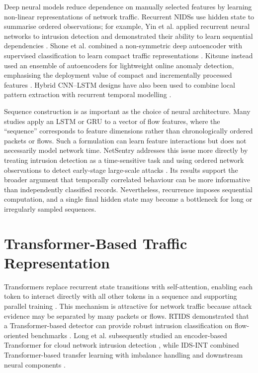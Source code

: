 \documentclass[11pt,fleqn]{report}
\begin{document}
Deep neural models reduce dependence on manually selected features by learning non-linear representations of network traffic. Recurrent NIDSs use hidden state to summarise ordered observations; for example, Yin et al. applied recurrent neural networks to intrusion detection and demonstrated their ability to learn sequential dependencies \cite{Yin2017RNNIDS}. Shone et al. combined a non-symmetric deep autoencoder with supervised classification to learn compact traffic representations \cite{Shone2018NNAE}. Kitsune instead used an ensemble of autoencoders for lightweight online anomaly detection, emphasising the deployment value of compact and incrementally processed features \cite{Mirsky2018Kitsune}. Hybrid CNN--LSTM designs have also been used to combine local pattern extraction with recurrent temporal modelling \cite{Ullah2024IDSINT}.

Sequence construction is as important as the choice of neural architecture. Many studies apply an LSTM or GRU to a vector of flow features, where the ``sequence'' corresponds to feature dimensions rather than chronologically ordered packets or flows. Such a formulation can learn feature interactions but does not necessarily model network time. NetSentry addresses this issue more directly by treating intrusion detection as a time-sensitive task and using ordered network observations to detect early-stage large-scale attacks \cite{LiuPatras2022NetSentry}. Its results support the broader argument that temporally correlated behaviour can be more informative than independently classified records. Nevertheless, recurrence imposes sequential computation, and a single final hidden state may become a bottleneck for long or irregularly sampled sequences.

\section{Transformer-Based Traffic Representation}
\label{subsec:rw_transformers}

Transformers replace recurrent state transitions with self-attention, enabling each token to interact directly with all other tokens in a sequence and supporting parallel training \cite{Vaswani2017}. This mechanism is attractive for network traffic because attack evidence may be separated by many packets or flows. RTIDS demonstrated that a Transformer-based detector can provide robust intrusion classification on flow-oriented benchmarks \cite{Wu2022RTIDS}. Long et al. subsequently studied an encoder-based Transformer for cloud network intrusion detection \cite{Long2024TransformerNIDS}, while IDS-INT combined Transformer-based transfer learning with imbalance handling and downstream neural components \cite{Ullah2024IDSINT}.
\end{document}
